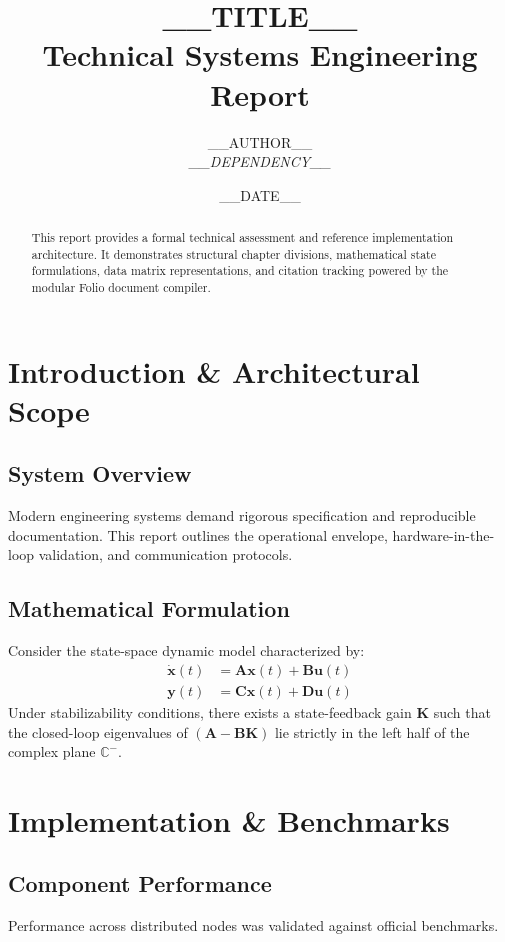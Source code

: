 \documentclass[11pt, a4paper]{report}
\title{\textbf{__TITLE__}\\ \large Technical Systems Engineering Report}
\author{__AUTHOR__ \\ \large \textit{__DEPENDENCY__}}
\date{__DATE__}
\begin{document}
\maketitle

\begin{abstract}
This report provides a formal technical assessment and reference implementation architecture. It demonstrates structural chapter divisions, mathematical state formulations, data matrix representations, and citation tracking powered by the modular Folio document compiler.
\end{abstract}

\tableofcontents
\newpage

\chapter{Introduction \& Architectural Scope}

\section{System Overview}
Modern engineering systems demand rigorous specification and reproducible documentation. This report outlines the operational envelope, hardware-in-the-loop validation, and communication protocols.

\section{Mathematical Formulation}
Consider the state-space dynamic model characterized by:
\begin{align}
    \dot{\mathbf{x}}(t) &= \mathbf{A}\mathbf{x}(t) + \mathbf{B}\mathbf{u}(t) \\
    \mathbf{y}(t)       &= \mathbf{C}\mathbf{x}(t) + \mathbf{D}\mathbf{u}(t)
\end{align}
Under stabilizability conditions, there exists a state-feedback gain $\mathbf{K}$ such that the closed-loop eigenvalues of $(\mathbf{A} - \mathbf{B}\mathbf{K})$ lie strictly in the left half of the complex plane $\mathbb{C}^-$.

\chapter{Implementation \& Benchmarks}

\section{Component Performance}
Performance across distributed nodes was validated against official benchmarks.
\end{document}
